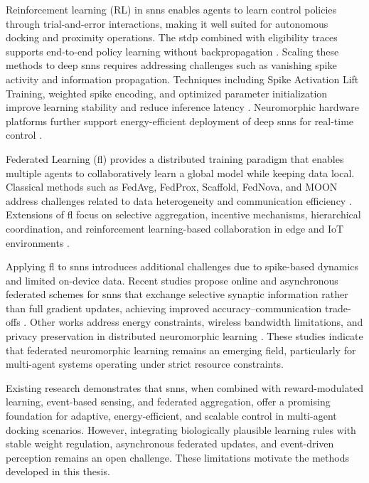 Reinforcement learning (RL) in \ac{snn}s enables agents to learn control policies through trial-and-error interactions, making it well suited for autonomous docking and proximity operations. The \ac{stdp} combined with eligibility traces supports end-to-end policy learning without backpropagation \cite{TavanaeiMaida2018BPSTDP, AnwaniRajendran2020NormAD, TaherkhaniBelatreche2018BPSL}. Scaling these methods to deep \ac{snn}s requires addressing challenges such as vanishing spike activity and information propagation. Techniques including Spike Activation Lift Training, weighted spike encoding, and optimized parameter initialization improve learning stability and reduce inference latency \cite{KimPanda2021SALT, KimHuh2018Weighted, DingZhang2025Init}. Neuromorphic hardware platforms further support energy-efficient deployment of deep \ac{snn}s for real-time control \cite{LinYuan2020ReRAM, WangZhang2025Ternary}.

Federated Learning (\ac{fl}) provides a distributed training paradigm that enables multiple agents to collaboratively learn a global model while keeping data local. Classical methods such as FedAvg, FedProx, Scaffold, FedNova, and MOON address challenges related to data heterogeneity and communication efficiency \cite{Ch_1_R26, Ch_1_R27, Ch_1_R28, Ch_1_R29, Ch_1_R30}. Extensions of \ac{fl} focus on selective aggregation, incentive mechanisms, hierarchical coordination, and reinforcement learning-based collaboration in edge and IoT environments \cite{Ch2_R40, Ch2_R41, Ch2_R42, Ch2_R43, Ch2_R44, Ch2_R45, Ch2_R46, Ch2_R47, Ch2_R50, Ch2_R51, Ch2_R52, Ch2_R53}.

Applying \ac{fl} to \ac{snn}s introduces additional challenges due to spike-based dynamics and limited on-device data. Recent studies propose online and asynchronous federated schemes for \ac{snn}s that exchange selective synaptic information rather than full gradient updates, achieving improved accuracy–communication trade-offs \cite{Ch_1_R2}. Other works address energy constraints, wireless bandwidth limitations, and privacy preservation in distributed neuromorphic learning \cite{Ch_1_R1, Ch_1_R4, Ch_1_R9}. These studies indicate that federated neuromorphic learning remains an emerging field, particularly for multi-agent systems operating under strict resource constraints.

Existing research demonstrates that \ac{snn}s, when combined with reward-modulated learning, event-based sensing, and federated aggregation, offer a promising foundation for adaptive, energy-efficient, and scalable control in multi-agent docking scenarios. However, integrating biologically plausible learning rules with stable weight regulation, asynchronous federated updates, and event-driven perception remains an open challenge. These limitations motivate the methods developed in this thesis.
